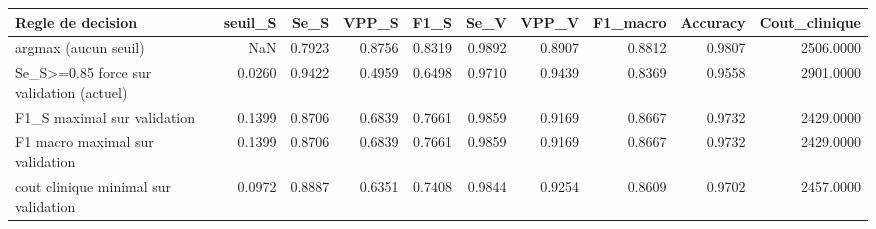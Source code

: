 \begin{tabular}{lrrrrrrrrr}
\toprule
Regle de decision & seuil_S & Se_S & VPP_S & F1_S & Se_V & VPP_V & F1_macro & Accuracy & Cout_clinique \\
\midrule
argmax (aucun seuil) & NaN & 0.7923 & 0.8756 & 0.8319 & 0.9892 & 0.8907 & 0.8812 & 0.9807 & 2506.0000 \\
Se_S>=0.85 force sur validation (actuel) & 0.0260 & 0.9422 & 0.4959 & 0.6498 & 0.9710 & 0.9439 & 0.8369 & 0.9558 & 2901.0000 \\
F1_S maximal sur validation & 0.1399 & 0.8706 & 0.6839 & 0.7661 & 0.9859 & 0.9169 & 0.8667 & 0.9732 & 2429.0000 \\
F1 macro maximal sur validation & 0.1399 & 0.8706 & 0.6839 & 0.7661 & 0.9859 & 0.9169 & 0.8667 & 0.9732 & 2429.0000 \\
cout clinique minimal sur validation & 0.0972 & 0.8887 & 0.6351 & 0.7408 & 0.9844 & 0.9254 & 0.8609 & 0.9702 & 2457.0000 \\
\bottomrule
\end{tabular}
